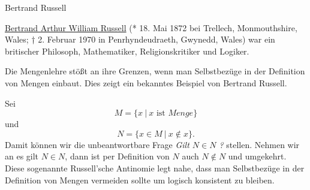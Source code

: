 \begin{emphBox}{Bertrand Russell}{}

\href{https://de.wikipedia.org/wiki/Bertrand\_Russell}{Bertrand Arthur William Russell} (* 18. Mai 1872 bei Trellech, Monmouthshire, Wales; † 2. Februar 1970 in Penrhyndeudraeth, Gwynedd, Wales) war ein britischer Philosoph, Mathematiker, Religionskritiker und Logiker.
\end{emphBox}

Die Mengenlehre stößt an ihre Grenzen, wenn man Selbstbezüge in der Definition von Mengen einbaut. Dies zeigt ein bekanntes Beispiel von Bertrand Russell.

Sei
\begin{equation*}
 M=\{ x ~|~x \text{ ist } Menge \}
\end{equation*}
und
\begin{equation*}
N = \{x \in M~|~x \notin x\}.
\end{equation*}
Damit können wir die unbeantwortbare Frage \emph{Gilt \(N \in N\) ?} stellen. Nehmen wir an es gilt \(N \in N\), dann ist per Definition von \(N\) auch \(N \notin N\) und umgekehrt. Diese sogenannte Russell’sche Antinomie legt nahe, dass man Selbstbezüge in der Definition von Mengen vermeiden sollte um logisch konsistent zu bleiben.



